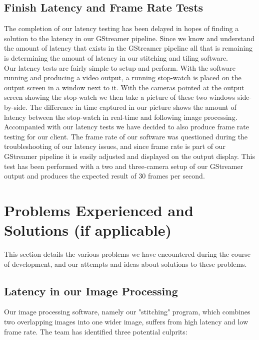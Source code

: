 \documentclass[letterpaper,10pt,serif,draftclsnofoot,onecolumn,compsoc,titlepage]{IEEEtran}
\begin{document}
\subsection{Finish Latency and Frame Rate Tests}

The completion of our latency testing has been delayed in hopes of finding a solution to 
the latency in our GStreamer pipeline. Since we know and understand the amount of latency 
that exists in the GStreamer pipeline all that is remaining is determining the amount of 
latency in our stitching and tiling software. \\

Our latency tests are fairly simple to setup and perform. With the software running and 
producing a video output, a running stop-watch is placed on the output screen in a window 
next to it. With the cameras pointed at the output screen showing the stop-watch we then 
take a picture of these two windows side-by-side. The difference in time captured in our 
picture shows the amount of latency between the stop-watch in real-time and following 
image processing. \\

Accompanied with our latency tests we have decided to also produce frame rate testing for 
our client. The frame rate of our software was questioned during the troubleshooting of 
our latency issues, and since frame rate is part of our GStreamer pipeline it is easily 
adjusted and displayed on the output display. This test has been performed with a two and 
three-camera setup of our GStreamer output and produces the expected result of 30 frames 
per second.  \\

\section{Problems Experienced and Solutions (if applicable)}

This section details the various problems we have encountered during the course of development, 
and our attempts and ideas about solutions to these problems.

\subsection{Latency in our Image Processing}
Our image processing software, namely our "stitching" program, which combines two overlapping 
images into one wider image, suffers from high latency and low frame rate. The team has 
identified three potential culprits:
\end{document}
